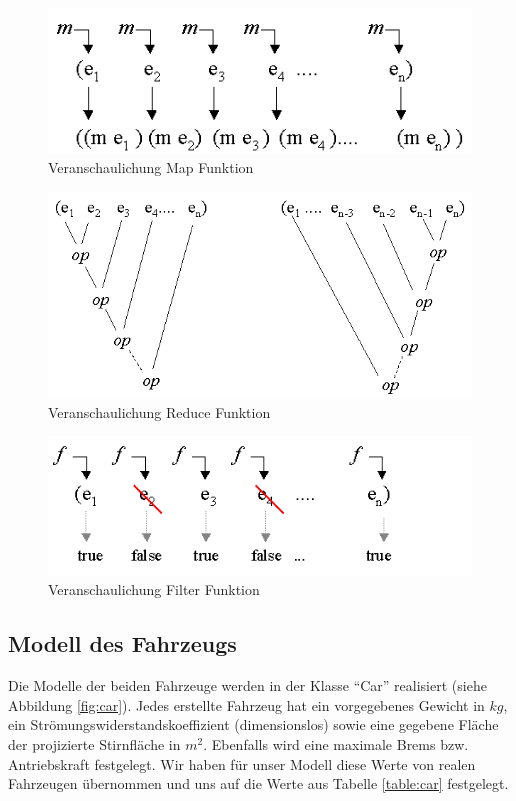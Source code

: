\documentclass[12pt,a4paper,bibliography=totocnumbered,listof=totocnumbered, abstracton]{scrartcl}
\theoremstyle{Umgebung}
\begin{document}
\begin{figure}
	\centering
	\includegraphics[width=0.6\linewidth]{img/practical/map}
	\caption{Veranschaulichung Map Funktion}
	\label{fig:map}
\end{figure}

\begin{figure}
	\centering
	\includegraphics[width=0.6\linewidth]{img/practical/reduction}
	\caption{Veranschaulichung Reduce Funktion}
	\label{fig:reduce}
\end{figure}

\begin{figure}
	\centering
	\includegraphics[width=0.6\linewidth]{img/practical/filter}
	\caption{Veranschaulichung Filter Funktion}
	\label{fig:filter}
\end{figure}

\subsection{Modell des Fahrzeugs}

Die Modelle der beiden Fahrzeuge werden in der Klasse \enquote{Car} realisiert (siehe Abbildung \ref{fig:car}). Jedes erstellte Fahrzeug hat ein vorgegebenes Gewicht in $kg$, ein Strömungswiderstandskoeffizient (dimensionslos) sowie eine gegebene Fläche der projizierte Stirnfläche in $m^2$. Ebenfalls wird eine maximale Brems bzw. Antriebskraft festgelegt. Wir haben für unser Modell diese Werte von realen Fahrzeugen übernommen und uns auf die Werte aus Tabelle \ref{table:car} festgelegt.
\end{document}

